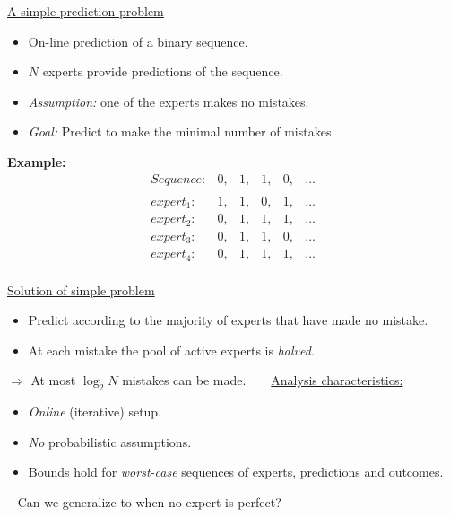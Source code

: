 \pagebreak

\begin{flushleft}
\begin{LARGE}


\begin{center}
\underline{A simple prediction problem}
\end{center}

\begin{itemize}
\item On-line prediction of a binary sequence.
\item $N$ experts provide predictions of the sequence.
\item {\it Assumption:} one of the experts makes no mistakes.
\item {\it Goal:} Predict to make the minimal number of mistakes.
\end{itemize}

{\bf Example:}
\[\begin{array}{lccccc}
Sequence: &0,&1,&1,&0,&\ldots \\
\\
expert_1: &1,&1,&0,&1,&\ldots \\
expert_2: &0,&1,&1,&1,&\ldots \\
expert_3: &0,&1,&1,&0,&\ldots \\
expert_4: &0,&1,&1,&1,&\ldots \\
\end{array} \]

\pagebreak

\begin{center}
\underline{Solution of simple problem}
\end{center}

\begin{itemize}
\item
Predict according to the majority of experts that have made no mistake.
\item
At each mistake the pool of active experts is {\em halved}.
\end{itemize}
$\Rightarrow$ At most $\log_2 N$ mistakes can be made.
~\newline\newline
~\newline\newline
\underline{Analysis characteristics:}
\begin{itemize}
\item
{\em Online} (iterative) setup.
\item
{\em No} probabilistic assumptions.
\item
Bounds hold for {\em worst-case} sequences of experts, predictions and outcomes.
\end{itemize}
~\newline
Can we generalize to when no expert is perfect?


\end{LARGE}
\end{flushleft}
